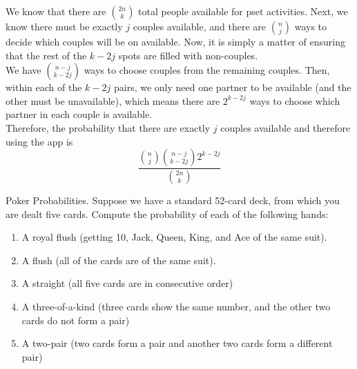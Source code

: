 \documentclass[11pt]{article}
\begin{document}
\begin{solution}{2.5}
We know that there are ${2n \choose k}$ total people available for pset activities. Next, we know there must be exactly $j$ couples available, and there are ${n \choose j}$ ways to decide which couples will be on available. Now, it is simply a matter of ensuring that the rest of the $k-2j$ spots are filled with non-couples. \\

We have ${n-j \choose k-2j}$ ways to choose couples from the remaining couples. Then, within each of the $k-2j$ pairs, we only need one partner to be available (and the other must be unavailable), which means there are $2^{k-2j}$ ways to choose which partner in each couple is available. \\

Therefore, the probability that there are exactly $j$ couples available and therefore using the app is 
    $$\frac{{n \choose j} {n-j \choose k-2j} 2^{k-2j}}{{\binom{2n} {k}}}$$
\end{solution}

\begin{exercise}{Poker Probabilities.}
Suppose we have a standard 52-card deck, from which you are dealt five cards. Compute the probability of each of the following hands:
    \begin{enumerate}
        \item A royal flush (getting 10, Jack, Queen, King, and Ace of the same suit).
        \item A flush (all of the cards are of the same suit).
        \item A straight (all five cards are in consecutive order)
        \item A three-of-a-kind (three cards show the same number, and the other two cards do not form a pair)
        \item A two-pair (two cards form a pair and another two cards form a different pair)
    \end{enumerate}
\end{exercise}
\end{document}
